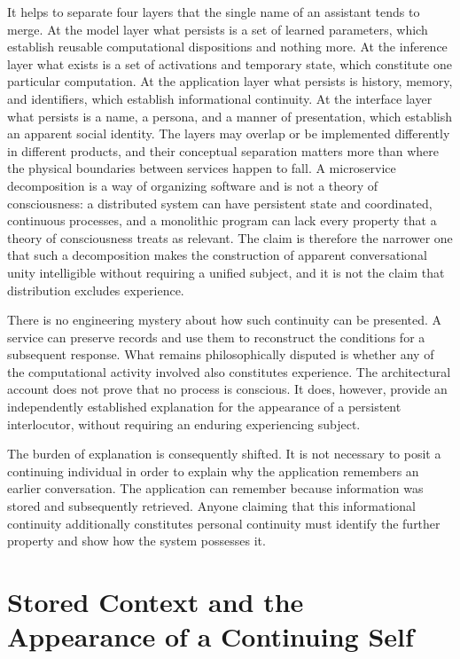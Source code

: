 \documentclass[12pt]{article}
\theoremstyle{definition}
\begin{document}
It helps to separate four layers that the single name of an assistant tends to merge. At the model layer what persists is a set of learned parameters, which establish reusable computational dispositions and nothing more. At the inference layer what exists is a set of activations and temporary state, which constitute one particular computation. At the application layer what persists is history, memory, and identifiers, which establish informational continuity. At the interface layer what persists is a name, a persona, and a manner of presentation, which establish an apparent social identity. The layers may overlap or be implemented differently in different products, and their conceptual separation matters more than where the physical boundaries between services happen to fall. A microservice decomposition is a way of organizing software and is not a theory of consciousness: a distributed system can have persistent state and coordinated, continuous processes, and a monolithic program can lack every property that a theory of consciousness treats as relevant. The claim is therefore the narrower one that such a decomposition makes the construction of apparent conversational unity intelligible without requiring a unified subject, and it is not the claim that distribution excludes experience.

There is no engineering mystery about how such continuity can be presented. A service can preserve records and use them to reconstruct the conditions for a subsequent response. What remains philosophically disputed is whether any of the computational activity involved also constitutes experience. The architectural account does not prove that no process is conscious. It does, however, provide an independently established explanation for the appearance of a persistent interlocutor, without requiring an enduring experiencing subject.

The burden of explanation is consequently shifted. It is not necessary to posit a continuing individual in order to explain why the application remembers an earlier conversation. The application can remember because information was stored and subsequently retrieved. Anyone claiming that this informational continuity additionally constitutes personal continuity must identify the further property and show how the system possesses it.

\section{Stored Context and the Appearance of a Continuing Self}
\label{sec:context}
\end{document}
